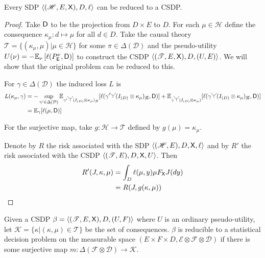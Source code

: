 \begin{theorem}
Every SDP $\langle (\mathscr{H},E,\mathsf{X}),D,\ell\rangle$ can be reduced to a CSDP.
\end{theorem}
\begin{proof}
Take $\mathsf{D}$ to be the projection from $D\times E$ to $D$. For each $\mu\in \mathscr{H}$ define the consequence $\kappa_\mu:d\mapsto \mu$ for all $d\in D$. Take the causal theory $\mathscr{T}=\{(\kappa_\mu,\mu)|\mu\in \mathscr{H}\}$ for some $\pi\in \Delta(\mathcal{D})$ and the pseudo-utility $U(\nu) = -\mathbb{E}_\nu \left[\ell(P^\nu_{\mathsf{E}},\mathsf{D})\right]$ to construct the CSDP $\langle (\mathscr{T},E,\mathsf{X}),D,(U,E)\rangle$. We will show that the original problem can be reduced to this.

For $\gamma\in \Delta(\mathcal{D})$ the induced loss $L$ is
\begin{align}
    L(\kappa_\mu,\gamma) &= -\sup_{\gamma'\in \Delta(\mathcal{D})} \mathbb{E}_{\gamma' \splitter{0.15}(I_{(D)}\otimes \kappa_\mu)_{|\RV{E}}}[\ell(\gamma'\splitter{0.15}(I_{(D)}\otimes \kappa_\mu)_{|\RV{E}},\RV{D})] + \mathbb{E}_{\gamma \splitter{0.15}(I_{(D)}\otimes \kappa_\mu)}[\ell(\gamma \splitter{0.15}(I_{(D)}\otimes \kappa_\mu)_{|\RV{E}},\RV{D})]\\
                     &= \mathbb{E}_{\gamma}[\ell(\mu,\RV{D})]
\end{align}

For the surjective map, take $g:\mathscr{H}\to \mathscr{T}$ defined by $g(\mu)=\kappa_\mu$.

Denote by $R$ the risk associated with the SDP $\langle (\mathscr{H},E),D,\mathsf{X},\ell\rangle$ and by $R'$ the risk associated with the CSDP $\langle (\mathscr{T},E),D,\mathsf{X},U\rangle$. Then
\begin{align}
    R'(J,\kappa,\mu) &= \int_D \ell(\mu, y) \mu F_{\mathsf{X}} J(dy)\\
                   &=R(J,g(\kappa,\mu))
\end{align}
\end{proof}

\begin{theorem}
Given a CSDP $\beta=\langle (\mathscr{T},E,\mathsf{X}),D,(U,F)\rangle$ where $U$ is an ordinary pseudo-utility, let $\mathscr{K}=\{\kappa|(\kappa,\mu)\in \mathscr{T}\}$ be the set of consequences. $\beta$ is reducible to a statistical decision problem on the measurable space $(E\times F\times D,\mathcal{E}\otimes \mathcal{F}\otimes \mathcal{D})$ if there is some surjective map $m:\Delta(\mathcal{F}\otimes\mathcal{D})\to \mathscr{K}$.
\end{theorem}

